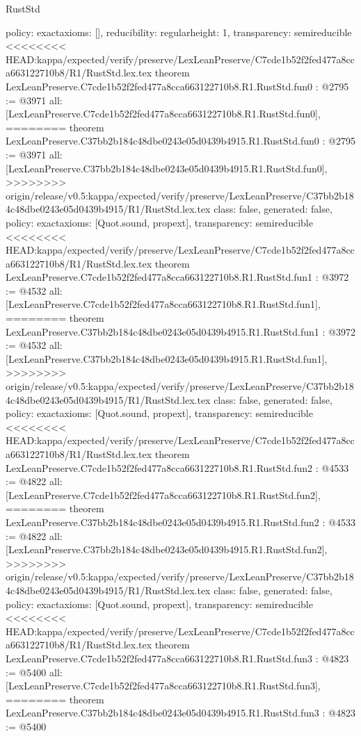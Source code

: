 \begin{lexlean}{RustStd}
\begin{coremodule}
{\begin{coremodule}
{{{  policy: exact{axioms: []},
  reducibility: regular{height: 1},
  transparency: semireducible
}
<<<<<<<< HEAD:kappa/expected/verify/preserve/LexLeanPreserve/C7cde1b52f2fed477a8cca663122710b8/R1/RustStd.lex.tex
theorem LexLeanPreserve.C7cde1b52f2fed477a8cca663122710b8.R1.RustStd.fun0 : @2795 := @3971 {
  all: [LexLeanPreserve.C7cde1b52f2fed477a8cca663122710b8.R1.RustStd.fun0],
========
theorem LexLeanPreserve.C37bb2b184c48dbe0243e05d0439b4915.R1.RustStd.fun0 : @2795 := @3971 {
  all: [LexLeanPreserve.C37bb2b184c48dbe0243e05d0439b4915.R1.RustStd.fun0],
>>>>>>>> origin/release/v0.5:kappa/expected/verify/preserve/LexLeanPreserve/C37bb2b184c48dbe0243e05d0439b4915/R1/RustStd.lex.tex
  class: false,
  generated: false,
  policy: exact{axioms: [Quot.sound, propext]},
  transparency: semireducible
}
<<<<<<<< HEAD:kappa/expected/verify/preserve/LexLeanPreserve/C7cde1b52f2fed477a8cca663122710b8/R1/RustStd.lex.tex
theorem LexLeanPreserve.C7cde1b52f2fed477a8cca663122710b8.R1.RustStd.fun1 : @3972 := @4532 {
  all: [LexLeanPreserve.C7cde1b52f2fed477a8cca663122710b8.R1.RustStd.fun1],
========
theorem LexLeanPreserve.C37bb2b184c48dbe0243e05d0439b4915.R1.RustStd.fun1 : @3972 := @4532 {
  all: [LexLeanPreserve.C37bb2b184c48dbe0243e05d0439b4915.R1.RustStd.fun1],
>>>>>>>> origin/release/v0.5:kappa/expected/verify/preserve/LexLeanPreserve/C37bb2b184c48dbe0243e05d0439b4915/R1/RustStd.lex.tex
  class: false,
  generated: false,
  policy: exact{axioms: [Quot.sound, propext]},
  transparency: semireducible
}
<<<<<<<< HEAD:kappa/expected/verify/preserve/LexLeanPreserve/C7cde1b52f2fed477a8cca663122710b8/R1/RustStd.lex.tex
theorem LexLeanPreserve.C7cde1b52f2fed477a8cca663122710b8.R1.RustStd.fun2 : @4533 := @4822 {
  all: [LexLeanPreserve.C7cde1b52f2fed477a8cca663122710b8.R1.RustStd.fun2],
========
theorem LexLeanPreserve.C37bb2b184c48dbe0243e05d0439b4915.R1.RustStd.fun2 : @4533 := @4822 {
  all: [LexLeanPreserve.C37bb2b184c48dbe0243e05d0439b4915.R1.RustStd.fun2],
>>>>>>>> origin/release/v0.5:kappa/expected/verify/preserve/LexLeanPreserve/C37bb2b184c48dbe0243e05d0439b4915/R1/RustStd.lex.tex
  class: false,
  generated: false,
  policy: exact{axioms: [Quot.sound, propext]},
  transparency: semireducible
}
<<<<<<<< HEAD:kappa/expected/verify/preserve/LexLeanPreserve/C7cde1b52f2fed477a8cca663122710b8/R1/RustStd.lex.tex
theorem LexLeanPreserve.C7cde1b52f2fed477a8cca663122710b8.R1.RustStd.fun3 : @4823 := @5400 {
  all: [LexLeanPreserve.C7cde1b52f2fed477a8cca663122710b8.R1.RustStd.fun3],
========
theorem LexLeanPreserve.C37bb2b184c48dbe0243e05d0439b4915.R1.RustStd.fun3 : @4823 := @5400 {
}}}}}}}
\end{coremodule}}
\end{coremodule}
\end{lexlean}
